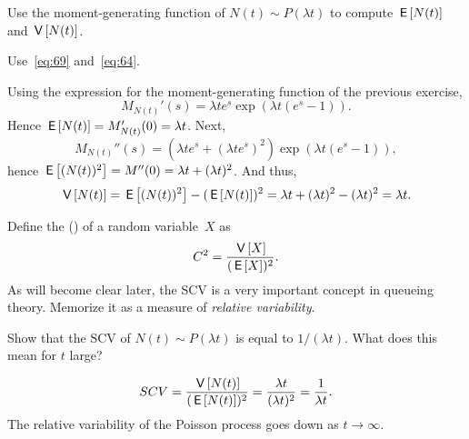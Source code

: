 \begin{exercise}{\faCalculator}
Use  the moment-generating function of $N(t)\sim P(\lambda t)$ to compute $\,\mathsf{E}\left[N(t)\right]$ and $\,\mathsf{V}\left[N(t)\right]$. 
\begin{hint}
Use~\eqref{eq:69} and~\eqref{eq:64}. 
\end{hint}
\begin{solution}
Using the expression for the moment-generating function of the previous exercise,
  \begin{equation*}
    M_{N(t)}'(s) = \lambda t e^s \exp(\lambda t(e^s - 1)).
  \end{equation*}
Hence $\,\mathsf{E}\left[N(t)\right] = M_{N(t)}'(0) = \lambda t $. Next, 
  \begin{equation*}
    M_{N(t)}''(s) = (\lambda t e^s + (\lambda t e^s)^2) \exp(\lambda t(e^s - 1)),
  \end{equation*}
hence $\,\mathsf{E}\left[(N(t))^2\right] = M''(0) = \lambda t + (\lambda t)^2$. And thus, 
\begin{equation*}
\,\mathsf{V}\left[N(t)\right] =\,\mathsf{E}\left[(N(t))^2\right]-(\,\mathsf{E}\left[N(t)\right])^2 = \lambda t + (\lambda t)^2 - (\lambda t)^2 = \lambda t.
\end{equation*}
\end{solution}
\end{exercise}

Define the  () of a random variable~$X$ as 
\begin{equation}\label{eq:62}
  C^2= \frac{\,\mathsf{V}\left[X\right]}{(\,\mathsf{E}\left[X\right])^2}.
\end{equation}
As  will become clear later, the SCV is a very important concept in
  queueing theory. Memorize it as a measure of \emph{relative
  variability}.

\begin{exercise}{\faFlask}
Show that   the SCV of $N(t)\sim P(\lambda t)$ is equal to $1/(\lambda t)$.  What does this mean for $t$ large?
  \begin{solution}
    \begin{equation*}
SCV = \frac{\,\mathsf{V}\left[N(t)\right]}{(\,\mathsf{E}\left[N(t)\right])^2} = \frac{\lambda t}{(\lambda t)^2} = \frac1{\lambda t}.
    \end{equation*}
The relative variability of the Poisson process goes down as $t\to\infty$.  
  \end{solution}
\end{exercise}


